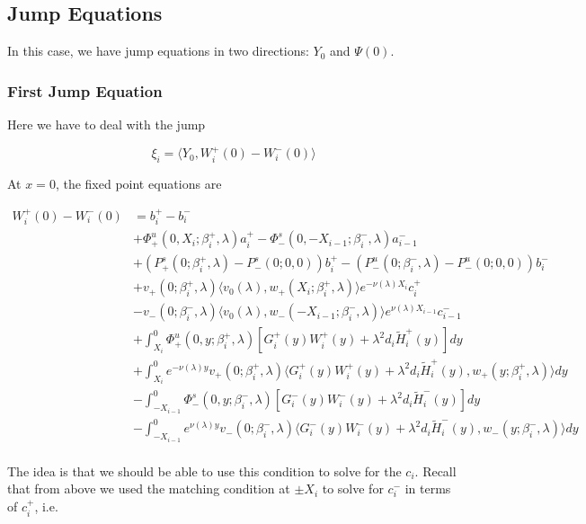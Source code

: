 \documentclass[12pt]{article}
\begin{document}
\subsection{Jump Equations}

In this case, we have jump equations in two directions: $Y_0$ and $\Psi(0)$. 

\subsubsection{First Jump Equation}

Here we have to deal with the jump 

\begin{equation}
\xi_i = \langle Y_0, W_i^+(0) - W_i^-(0) \rangle 
\end{equation}

At $x = 0$, the fixed point equations are

\begin{align*}
W_i^+(0) - W_i^-(0) &= b_i^+ - b_i^- \\
&+ \Phi^u_+(0, X_i; \beta_i^+, \lambda)a_i^+ - \Phi^s_-(0, -X_{i-1}; \beta_i^-, \lambda)a_{i-1}^- \\
&+(P^s_+(0; \beta_i^+, \lambda) - P^s_-(0; 0, 0))b_i^+  - (P^u_-(0; \beta_i^-, \lambda) - P^u_-(0; 0, 0))b_i^- \\
&+ v_+(0; \beta_i^+, \lambda) \langle v_0(\lambda), w_+(X_i; \beta_i^+, \lambda) \rangle e^{-\nu(\lambda)X_i} c_i^+ \\
&- v_-(0; \beta_i^-, \lambda) \langle v_0(\lambda), w_-(-X_{i-1}; \beta_i^-, \lambda) \rangle e^{\nu(\lambda)X_{i-1}} c_{i-1}^- \\
&+ \int_{X_i}^0 \Phi^u_+(0, y; \beta_i^+, \lambda) [ G_i^+(y)W_i^+(y) + \lambda^2 d_i \tilde{H}_i^+(y) ] dy \\
&+ \int_{X_i}^0 e^{-\nu(\lambda)y} v_+(0; \beta_i^+, \lambda) \langle G_i^+(y)W_i^+(y) + \lambda^2 d_i \tilde{H}_i^+(y), w_+(y; \beta_i^+, \lambda) \rangle dy \\
&- \int_{-X_{i-1}}^0 \Phi^s_-(0, y; \beta_i^-, \lambda) [ G_i^-(y)W_i^-(y) + \lambda^2 d_i \tilde{H}_i^-(y) ] dy \\
&- \int_{-X_{i-1}}^0
e^{\nu(\lambda)y} v_-(0; \beta_i^-, \lambda) \langle G_i^-(y)W_i^-(y) + \lambda^2 d_i \tilde{H}_i^-(y), w_-(y; \beta_i^-, \lambda) \rangle dy \\
\end{align*}

The idea is that we should be able to use this condition to solve for the $c_i$. Recall that from above we used the matching condition at $\pm X_i$ to solve for $c_i^-$ in terms of $c_i^+$, i.e. 
\end{document}
